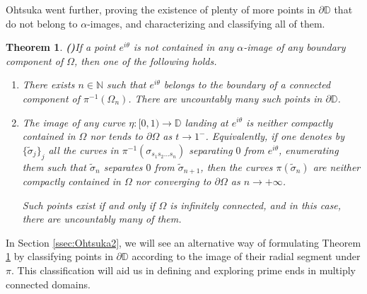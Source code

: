 \documentclass[11pt,a4paper,reqno]{amsart}
\theoremstyle{plain}
\newtheorem{thm}{Theorem}[section]
\theoremstyle{definition}
\theoremstyle{plain}
\def\DD{\mathbb{D}}
\renewcommand{\tilde}{\widetilde}
\begin{document}
  
  Ohtsuka went further, proving the existence of plenty of more points in $ \partial\mathbb{D} $ that do not belong to $\alpha$-images, and characterizing and   classifying all of them.
\begin{thm}{\bf ({\normalfont \cite[Thm. 5]{Oht54}})}\label{thm:notalphaimage}
If a point $e^{i\theta}$ is not contained in any $\alpha$-image of any boundary component of $\Omega$, then one of the following holds.
\begin{enumerate}[label={\em(\alph*)}]
	\item There exists $n\in\mathbb{N}$ such that $e^{i\theta}$ belongs to the boundary of a connected component of $\pi^{-1}(\Omega_n)$. There are uncountably many such points in $\partial\DD$.
	\item The image of any curve $\eta\colon[0, 1)\to\DD$ landing at $e^{i\theta}$ is neither compactly contained in $\Omega$ nor tends to $\partial\Omega$ as $t\to 1^{-}$. Equivalently, if one denotes by $\{\tilde\sigma_j\}_j$ all the curves in $\pi^{-1}(\sigma_{s_1s_2\dots s_n})$ separating $0$ from $e^{i\theta}$, enumerating them such that $\tilde\sigma_n$ separates $0$ from $\tilde\sigma_{n+1}$, then the curves $\pi(\tilde\sigma_n)$ are neither compactly contained in $\Omega$ nor converging to $\partial\Omega$ as $n\to+\infty$. 
	
	\noindent Such points exist if and only if $\Omega$ is infinitely connected, and in this case, there are uncountably many of them.
\end{enumerate}
\end{thm}
In Section \ref{ssec:Ohtsuka2}, we will see an alternative way of formulating Theorem \ref{thm:notalphaimage} by classifying points in $\partial\DD$ according to the image of their radial segment under $ \pi $. This classification will aid us in defining and exploring prime ends in multiply connected domains.
\end{document}
